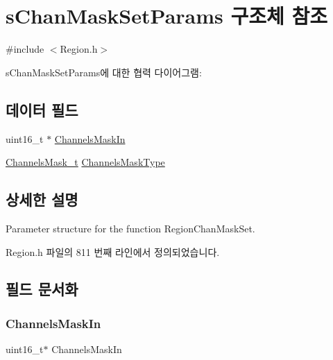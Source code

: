 \hypertarget{structs_chan_mask_set_params}{}\section{s\+Chan\+Mask\+Set\+Params 구조체 참조}
\label{structs_chan_mask_set_params}


{\ttfamily \#include $<$Region.\+h$>$}



s\+Chan\+Mask\+Set\+Params에 대한 협력 다이어그램\+:
\subsection*{데이터 필드}
\begin{DoxyCompactItemize}
\item 
uint16\+\_\+t $\ast$ \mbox{\hyperlink{structs_chan_mask_set_params_ade387d6ecaf27781b14ad97ebdfc0695}{Channels\+Mask\+In}}
\item 
\mbox{\hyperlink{group___r_e_g_i_o_n_ga933f695eea70935418e2175940b92311}{Channels\+Mask\+\_\+t}} \mbox{\hyperlink{structs_chan_mask_set_params_a02b75be74cbc34fa2126b2c250ea9283}{Channels\+Mask\+Type}}
\end{DoxyCompactItemize}


\subsection{상세한 설명}
Parameter structure for the function Region\+Chan\+Mask\+Set. 

Region.\+h 파일의 811 번째 라인에서 정의되었습니다.



\subsection{필드 문서화}
\mbox{\label{structs_chan_mask_set_params_ade387d6ecaf27781b14ad97ebdfc0695}} 
\subsubsection{\texorpdfstring{Channels\+Mask\+In}{ChannelsMaskIn}}
{\footnotesize\ttfamily uint16\+\_\+t$\ast$ Channels\+Mask\+In}

